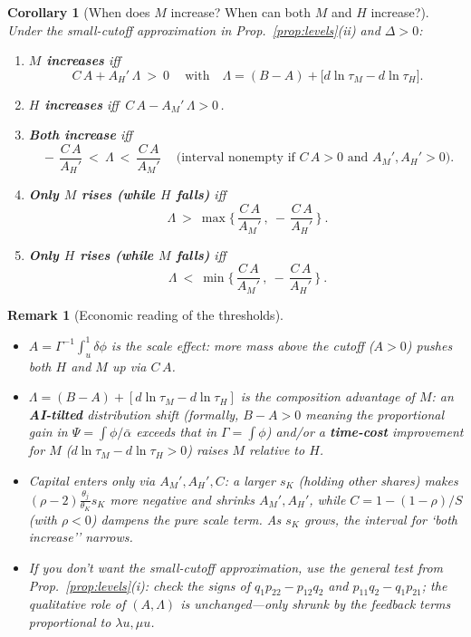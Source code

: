 \documentclass[english]{article}
\newtheorem{corollary}{Corollary}
\newtheorem{remark}{Remark}
\begin{document}
\begin{corollary}[When does $M$ increase? When can both $M$ and $H$ increase?]\label{cor:MHsigns}
Under the small-cutoff approximation in Prop.~\ref{prop:levels}(ii) and $\Delta>0$:
\begin{enumerate}
\item \textbf{$M$ increases} iff 
\[
\boxed{\ C\,A + A_H'\,\Lambda\ >\ 0\ }\quad\text{with}\quad \Lambda=(B-A)+\big[d\ln\tau_M-d\ln\tau_H\big].
\]
\item \textbf{$H$ increases} iff \(\boxed{\,C\,A - A_M'\,\Lambda>0\,}\).
\item \textbf{Both increase} iff
\[
\boxed{\ -\,\frac{C\,A}{A_H'}\ <\ \Lambda\ <\ \frac{C\,A}{A_M'}\ }\quad\text{(interval nonempty if $C\,A>0$ and $A_M',A_H'>0$).}
\]
\item \textbf{Only $M$ rises (while $H$ falls)} iff
\[
\boxed{\ \Lambda\ >\ \max\!\Big\{\,\frac{C\,A}{A_M'}\,,\ -\,\frac{C\,A}{A_H'}\,\Big\}\ }.
\]
\item \textbf{Only $H$ rises (while $M$ falls)} iff
\[
\boxed{\ \Lambda\ <\ \min\!\Big\{\,\frac{C\,A}{A_M'}\,,\ -\,\frac{C\,A}{A_H'}\,\Big\}\ }.
\]
\end{enumerate}
\end{corollary}

\begin{remark}[Economic reading of the thresholds]
\leavevmode
\begin{itemize}
\item $A=\Gamma^{-1}\!\int_u^1\delta\phi$ is the \emph{scale} effect: more mass above the cutoff ($A>0$) pushes both $H$ and $M$ up via $C\,A$.
\item $\Lambda=(B-A)+[d\ln\tau_M-d\ln\tau_H]$ is the \emph{composition} advantage of $M$: an \textbf{AI-tilted} distribution shift (formally, $B-A>0$ meaning the proportional gain in $\Psi=\int\phi/\bar\alpha$ exceeds that in $\Gamma=\int\phi$) and/or a \textbf{time-cost} improvement for $M$ ($d\ln\tau_M-d\ln\tau_H>0$) raises $M$ relative to $H$.
\item Capital enters \emph{only} via $A_M',A_H',C$: a larger $s_K$ (holding other shares) makes $(\rho-2)\frac{\theta_j}{\theta_K}s_K$ more negative and shrinks $A_M',A_H'$, while $C=1-(1-\rho)/S$ (with $\rho<0$) dampens the pure scale term. As $s_K$ grows, the interval for `both increase'' narrows.
\item If you don't want the small-cutoff approximation, use the general test from Prop.~\ref{prop:levels}(i): check the signs of $q_1 p_{22}-p_{12}q_2$ and $p_{11}q_2-q_1 p_{21}$; the qualitative role of $(A,\Lambda)$ is unchanged---only shrunk by the feedback terms proportional to $\lambda u,\mu u$.
\end{itemize}
\end{remark}
\end{document}
